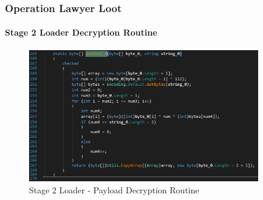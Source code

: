 \documentclass[aspectratio=169]{beamer}
\begin{document}
{
\begin{frame}
  \frametitle{Operation Lawyer Loot}
  \framesubtitle{Stage 2 Loader Decryption Routine}
  \begin{figure}
    \includegraphics[width=10cm]{stage-2-unpacking-routine}
    \caption{Stage 2 Loader - Payload Decryption Routine}
  \end{figure}
\end{frame}
}
\end{document}
